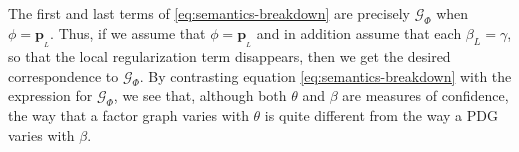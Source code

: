 \documentclass{article}
\theoremstyle{plain}
\theoremstyle{definition}
\theoremstyle{remark}
\newcommand\mat[1]{\mathbf{#1}}
\newcommand{\bp}[1][L]{\mat{p}_{\!_{#1}\!}}
\numberwithin{equation}{section}
\begin{document}
%
The first and last terms of
\eqref{eq:semantics-breakdown} are precisely $\mathcal G_\Phi$ when
$\phi = \bp$.
Thus, if we assume that $\phi = \bp$ and in addition assume that each
$\beta_L = \gamma$, so that the local regularization term
disappears, then we get the desired correspondence to $\mathcal G_\Phi$.
By contrasting equation
\eqref{eq:semantics-breakdown} with the expression for $\mathcal G_\Phi$, we see that, although
both $\theta$ and $\beta$ are measures of confidence, the way that 
a factor graph varies with $\theta$  
is quite different from the way a PDG varies with $\beta$.
\end{document}
